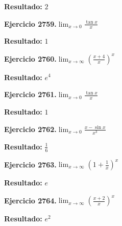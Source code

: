 \documentclass[10pt,a4paper]{article}
\begin{document}
\begin{solbox}
\textbf{Resultado:} \(\displaystyle 2\)
\end{solbox}

\begin{ejbox}
\textbf{Ejercicio 2759.}\quad $\lim_{x\to 0} \frac{\tan x}{x}$
\end{ejbox}

\begin{solbox}
\textbf{Resultado:} \(\displaystyle 1\)
\end{solbox}

\newpage
\begin{ejbox}
\textbf{Ejercicio 2760.}\quad $\lim_{x\to \infty} \left(\frac{x+4}{x}\right)^{x}$
\end{ejbox}

\begin{solbox}
\textbf{Resultado:} \(\displaystyle e^{4}\)
\end{solbox}

\begin{ejbox}
\textbf{Ejercicio 2761.}\quad $\lim_{x\to 0} \frac{\tan x}{x}$
\end{ejbox}

\begin{solbox}
\textbf{Resultado:} \(\displaystyle 1\)
\end{solbox}

\begin{ejbox}
\textbf{Ejercicio 2762.}\quad $\lim_{x\to 0} \frac{x-\sin x}{x^3}$
\end{ejbox}

\begin{solbox}
\textbf{Resultado:} \(\displaystyle \frac{1}{6}\)
\end{solbox}

\newpage
\begin{ejbox}
\textbf{Ejercicio 2763.}\quad $\lim_{x\to \infty} \left(1+\frac{1}{x}\right)^x$
\end{ejbox}

\begin{solbox}
\textbf{Resultado:} \(\displaystyle e\)
\end{solbox}

\begin{ejbox}
\textbf{Ejercicio 2764.}\quad $\lim_{x\to \infty} \left(\frac{x+2}{x}\right)^{x}$
\end{ejbox}

\begin{solbox}
\textbf{Resultado:} \(\displaystyle e^{2}\)
\end{solbox}
\end{document}
